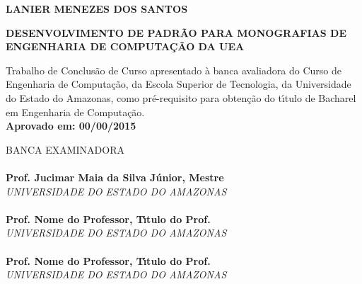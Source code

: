 \begin{center}
\bf LANIER MENEZES DOS SANTOS\\[1.5 cm]
\end{center}

\begin{center}
\bf DESENVOLVIMENTO DE PADR\~{A}O PARA MONOGRAFIAS DE ENGENHARIA DE COMPUTA\c{C}\~{A}O DA UEA\\[1.5cm]
\end{center}

\hspace*{8cm}
\begin{minipage}{8cm} 

Trabalho de Conclus\~{a}o de Curso apresentado \`{a} 
banca avaliadora do Curso de Engenharia de Computa\c{c}\~{a}o, 
da Escola Superior de Tecnologia, da Universidade do Estado do Amazonas, 
como pr\'e-requisito para obten\c{c}\~{a}o do t\'{\i}tulo de Bacharel em
Engenharia de Computa\c{c}\~{a}o.\\

\large \bf Aprovado em: 00/00/2015
\end{minipage} 

BANCA EXAMINADORA\\[12 pt]

\noindent \hrulefill \hspace*{6cm} \\
\noindent \textbf{Prof. Jucimar Maia da Silva J\'{u}nior, Mestre}\\
\textit{UNIVERSIDADE DO ESTADO DO AMAZONAS}\\[0.5cm]

\noindent \hrulefill \hspace*{6cm} \\
\noindent \textbf{Prof. Nome do Professor, T\'{\i}tulo do Prof.}\\
\textit{UNIVERSIDADE DO ESTADO DO AMAZONAS}\\[0.5cm]

\noindent \hrulefill \hspace*{6cm} \\
\noindent \textbf{Prof. Nome do Professor, T\'{\i}tulo do Prof.}\\
\textit{UNIVERSIDADE DO ESTADO DO AMAZONAS}\\